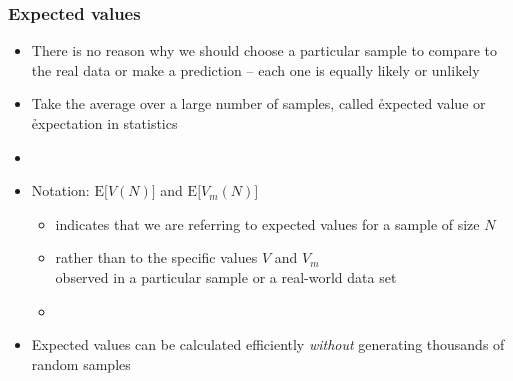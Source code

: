 \documentclass[t]{beamer} %
\begin{document}
\begin{frame}
  \frametitle{Expected values}

  \begin{itemize}
  \item There is no reason why we should choose a particular sample to compare
    to the real data or make a prediction -- each one is equally likely or
    unlikely
  \item Take the average over a large number of samples, called \h{expected
      value} or \h{expectation} in statistics
  \item[]
  \item Notation: $\text{E}\bigl[V(N)\bigr]$ and $\text{E}\bigl[V_m(N)\bigr]$
    \begin{itemize}
    \item indicates that we are referring to expected values for a sample of
      size $N$
    \item rather than to the specific values $V$ and $V_m$\\
      observed in a particular sample or a real-world data set
    \item[]
    \end{itemize}
  \item Expected values can be calculated efficiently \emph{without}
    generating thousands of random samples
  \end{itemize}
\end{frame}
\end{document}
